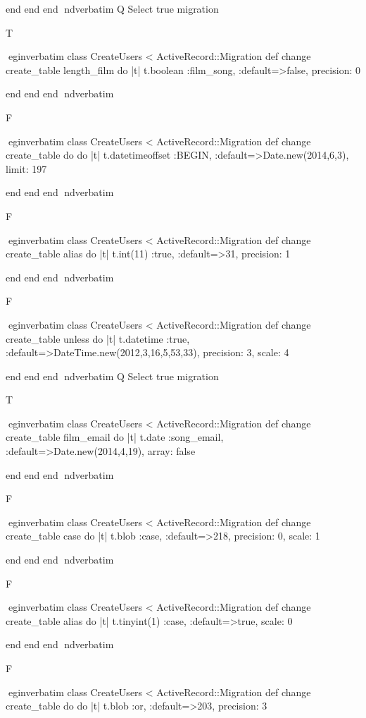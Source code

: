     end 
  end 
end
nd{verbatim}
Q
 Select true migration

T

egin{verbatim}
 class CreateUsers < ActiveRecord::Migration 
  def change 
    create_table length_film do |t| 
      t.boolean :film_song, :default=>false, precision: 0
    
    end 
  end 
end
nd{verbatim}

F

egin{verbatim}
 class CreateUsers < ActiveRecord::Migration 
  def change 
    create_table do do |t| 
      t.datetimeoffset :BEGIN, :default=>Date.new(2014,6,3), limit: 197
    
    end 
  end 
end
nd{verbatim}

F

egin{verbatim}
 class CreateUsers < ActiveRecord::Migration 
  def change 
    create_table alias do |t| 
      t.int(11) :true, :default=>31, precision: 1
    
    end 
  end 
end
nd{verbatim}

F

egin{verbatim}
 class CreateUsers < ActiveRecord::Migration 
  def change 
    create_table unless do |t| 
      t.datetime :true, :default=>DateTime.new(2012,3,16,5,53,33), precision: 3, scale: 4
    
    end 
  end 
end
nd{verbatim}
Q
 Select true migration

T

egin{verbatim}
 class CreateUsers < ActiveRecord::Migration 
  def change 
    create_table film_email do |t| 
      t.date :song_email, :default=>Date.new(2014,4,19), array: false
    
    end 
  end 
end
nd{verbatim}

F

egin{verbatim}
 class CreateUsers < ActiveRecord::Migration 
  def change 
    create_table case do |t| 
      t.blob :case, :default=>218, precision: 0, scale: 1
    
    end 
  end 
end
nd{verbatim}

F

egin{verbatim}
 class CreateUsers < ActiveRecord::Migration 
  def change 
    create_table alias do |t| 
      t.tinyint(1) :case, :default=>true, scale: 0
    
    end 
  end 
end
nd{verbatim}

F

egin{verbatim}
 class CreateUsers < ActiveRecord::Migration 
  def change 
    create_table do do |t| 
      t.blob :or, :default=>203, precision: 3
    
